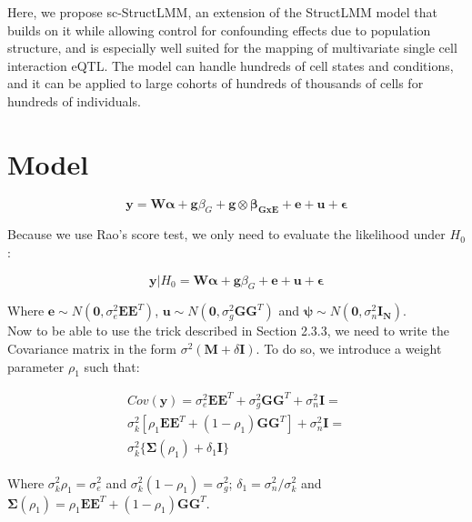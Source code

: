 Here, we propose sc-StructLMM, an extension of the StructLMM model that builds on it while allowing control for confounding effects due to population structure, and is especially well suited for the mapping of multivariate single cell interaction eQTL. 
The model can handle hundreds of cell states and conditions, and it can be applied to large cohorts of hundreds of thousands of cells for hundreds of  individuals.


\section{Model} 

\begin{equation}
 \mathbf{y} =  \mathbf{W}\boldsymbol{\alpha} + \mathbf{g}\beta_G + \mathbf{g} \otimes \boldsymbol{\beta_{GxE}} + \mathbf{e} + \mathbf{u} + \boldsymbol{\epsilon} 
\end{equation}

Because we use Rao's score test, we only need to evaluate the likelihood under $H_0$:

\begin{equation}
 \mathbf{y}|H_0 =  \mathbf{W}\boldsymbol{\alpha} + \mathbf{g}\beta_G + \mathbf{e} + \mathbf{u} + \boldsymbol{\epsilon} 
\end{equation}

Where $\mathbf{e} \sim N(\mathbf{0},\sigma_e^2 \mathbf{E}\mathbf{E}^T)$, $\mathbf{u} \sim N(\mathbf{0},\sigma_g^2 \mathbf{G}\mathbf{G}^T)$ and $\boldsymbol{\psi} \sim N(\mathbf{0},\sigma_n^2 \mathbf{I_N})$.\\

Now to be able to use the trick described in Section 2.3.3, we need to write the Covariance matrix in the form $\sigma^2(\mathbf{M}+\delta\mathbf{I})$.
To do so, we introduce a weight parameter $\rho_1$ such that:

\begin{equation}
\begin{split}
    Cov(\mathbf{y}) = \sigma_e^2 \mathbf{E}\mathbf{E}^T + \sigma_g^2 \mathbf{G}\mathbf{G}^T+ \sigma_n^2 \mathbf{I} =\\
    \sigma_k^2[\rho_1\mathbf{E}\mathbf{E}^T + (1-\rho_1) \mathbf{G}\mathbf{G}^T] + \sigma_n^2 \mathbf{I} =\\ \sigma_k^2\{\boldsymbol{\Sigma}(\rho_1) + \delta_1 \mathbf{I}\}
\end{split}
\end{equation}

Where $\sigma_k^2\rho_1 = \sigma_e^2$ and $\sigma_k^2(1-\rho_1) = \sigma_g^2$;
$\delta_1 = \sigma_n^2/\sigma_k^2$ and $\boldsymbol{\Sigma}(\rho_1) = \rho_1\mathbf{E}\mathbf{E}^T + (1-\rho_1) \mathbf{G}\mathbf{G}^T$.

